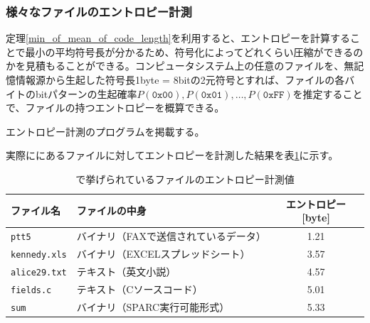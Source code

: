 \documentclass[uplatex,dvipdfmx,b5j,10pt]{jsbook}
\theoremstyle{definition}
\begin{document}
\subsubsection{様々なファイルのエントロピー計測}

定理\ref{min_of_mean_of_code_length}を利用すると、エントロピーを計算することで最小の平均符号長が分かるため、符号化によってどれくらい圧縮ができるのかを見積もることができる。コンピュータシステム上の任意のファイルを、無記憶情報源から生起した符号長1byte = 8bitの2元符号とすれば、ファイルの各バイトのbitパターンの生起確率$P(\texttt{0x00}), P(\texttt{0x01}), \dots, P(\texttt{0xFF})$を推定することで、ファイルの持つエントロピーを概算できる。

エントロピー計測のプログラムを掲載する。


実際に\cite{canterburycorpus}にあるファイルに対してエントロピーを計測した結果を表\ref{canterburyentropy}に示す。
\begin{table}[htbp]
  \begin{center}
    \caption{\cite{canterburycorpus}で挙げられているファイルのエントロピー計測値} \label{canterburyentropy}
    \begin{tabular}{|l|l|c|}
      \hline
      ファイル名 & ファイルの中身 & エントロピー[byte]                     \\ \hline
      \texttt{ptt5}         & バイナリ（FAXで送信されているデータ） & 1.21 \\ \hline
      \texttt{kennedy.xls}  & バイナリ（EXCELスプレッドシート）     & 3.57 \\ \hline
      \texttt{alice29.txt}  & テキスト（英文小説）                  & 4.57 \\ \hline
      \texttt{fields.c}     & テキスト（Cソースコード）             & 5.01 \\ \hline
      \texttt{sum}          & バイナリ（SPARC実行可能形式）         & 5.33 \\ \hline
    \end{tabular}
  \end{center}
\end{table}
\end{document}
